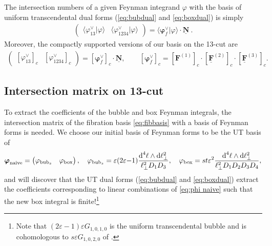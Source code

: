 \documentclass[11pt]{article}
\renewcommand{\d}{\text{d}}
\newcommand{\la}{\langle}
\newcommand{\ra}{\rangle}
\newcommand{\vphi}{\varphi}
\newcommand{\vep}{\varepsilon}
\newcommand{\bs}[1]{\boldsymbol{#1}}
\newcommand{\mat}[1]{\underline{\boldsymbol{#1}}}
\begin{document}
The intersection numbers of a given Feynman integrand $\vphi$ with the basis of uniform transcendental dual forms (\eqref{eq:bubdual} and \eqref{eq:boxdual}) is simply
\begin{align} \label{eq:UTint}
	\begin{pmatrix}
		\la \vphi^\vee_{13} \vert \vphi \ra
		&
		\la \vphi^\vee_{1234} \vert \vphi \ra
	\end{pmatrix}
	= \la \bs{\vphi}^\vee_f  \vert \vphi \ra \cdot \mat{N} \ .
\end{align}
Moreover, the compactly supported versions of our basis on the 13-cut are 
\begin{align}
	\begin{pmatrix}
		[\vphi^\vee_{13}]_c
		&
		[\vphi^\vee_{1234}]_c
	\end{pmatrix}
	=  [\bs{\vphi}^\vee_f]_c \cdot \mat{N},
	\qquad 
	[\bs{\vphi}^\vee_f]_c
	= [\bs{F}^{(1)}]_c \cdot [\underline{\bs{F}}^{(2)}]_c 
		\cdot [\underline{\bs{F}}^{(3)}]_c.
\end{align}


\subsection{Intersection matrix on 13-cut \label{sec:orthobasis}}

To extract the coefficients of the bubble and box Feynman integrals, the intersection matrix of the fibration basis \eqref{eq:fibbasis} with a basis of Feynman forms is needed. 
We choose our initial basis of Feynman forms to be the UT basis of \cite{Henn:2014qga}
\begin{align}
	\label{eq:phi naive}
	\bs{\vphi}_{\rm naive} 
	= \begin{pmatrix} \vphi_{\text{bub}_s} & \vphi_\text{box} \end{pmatrix},
	\quad
	\vphi_{{\rm bub}_s} = \vep (2\vep{-}1)  \frac{\d^4\ell \wedge \d\ell_\perp^2}{\ell_\perp^2 D_1 D_3},
	\quad 
	\vphi_{{\rm box}} = st\vep^2 \frac{\d^4\ell \wedge \d\ell_\perp^2}{\ell_\perp^2 D_1 D_2 D_3 D_4}, 
\end{align}
and will discover that the UT dual forms (\eqref{eq:bubdual} and \eqref{eq:boxdual}) extract the coefficients corresponding to linear combinations of \eqref{eq:phi naive} such that the new box integral is finite!\footnote{Note that $(2\vep{-}1) \vep G_{1,0,1,0}$ is the uniform transcendental bubble and is cohomologous to $s \vep G_{1,0,2,0}$ of \cite{Henn:2014qga}.}
\end{document}

